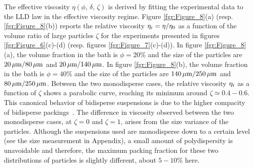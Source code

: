 \documentclass{jfm}
\begin{document}
The effective viscosity $\eta(\phi,\,\delta,\,\zeta)$ is derived by fitting the experimental data to the LLD law in the effective viscosity regime. Figure \ref{fgr:Figure_8}(a) (resp. \ref{fgr:Figure_8}(b)) reports the relative viscosity $\eta_{\rm r}=\eta/\eta_0$ as a function of the volume ratio of large particles $\zeta$  for the experiments presented in figures \ref{fgr:Figure_6}(c)-(d) (resp. figures \ref{fgr:Figure_7}(c)-(d)). In figure \ref{fgr:Figure_8}(a), the volume fraction in the bath is $\phi=20\%$ and the size of the particles are $20\,\mu{\rm m}/80\,\mu{\rm m}$ and $20\,\mu{\rm m}/ 140\,\mu{\rm m}$. In figure \ref{fgr:Figure_8}(b), the volume fraction in the bath is $\phi=40\%$ and the size of the particles are $140\,\mu{\rm m}/250\,\mu{\rm m}$ and $80\,\mu{\rm m}/250\,\mu{\rm m}$. Between the two monodisperse cases, the relative viscosity $\eta_{\rm r}$ as a function of $\zeta$ shows a parabolic curve, reaching its minimum around $\zeta \simeq 0.4-0.6$. This canonical behavior of bidisperse suspensions is due to the higher compacity of bidisperse packings~\cite[see \textit{e.g.}][]{pednekar2018bidisperse}. The difference in viscosity observed between the two monodisperse cases, at $\zeta=0$ and $\zeta=1$, arises from the size variance of the particles. Although the suspensions used are monodisperse down to a certain level  (see the size measurement in Appendix), a small amount of polydispersity is unavoidable and therefore, the maximum packing fraction for these two distributions of particles is slightly different, about $5-10\%$ here.
\end{document}
